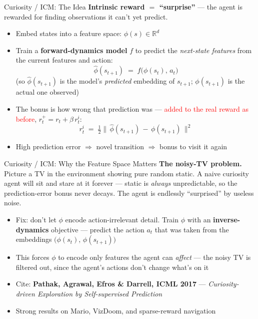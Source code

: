 \begin{frame}{Curiosity / ICM: The Idea}
\textbf{Intrinsic reward $=$ ``surprise''} --- the agent is rewarded for finding observations it can't yet predict.
\begin{itemize}
    \setlength{\itemsep}{0.55em}
    \item Embed states into a feature space: $\phi(s) \in \mathbb{R}^d$
    \item Train a \textbf{forward-dynamics model} $f$ to predict the \emph{next-state features} from the current features and action:
    \[
        \hat{\phi}(s_{t+1}) \;=\; f\!\big(\phi(s_t),\, a_t\big)
    \]
    (so $\hat{\phi}(s_{t+1})$ is the model's \emph{predicted} embedding of $s_{t+1}$; $\phi(s_{t+1})$ is the actual one observed)
    \item The bonus is how wrong that prediction was --- \textcolor{red}{added to the real reward as before}, $r_t^+ = r_t + \beta\, r_t^i$:
    \[
        r_t^i \;=\; \tfrac{1}{2}\big\|\,\hat{\phi}(s_{t+1}) \,-\, \phi(s_{t+1})\,\big\|^2
    \]
    \item High prediction error $\Rightarrow$ novel transition $\Rightarrow$ bonus to visit it again
\end{itemize}
\end{frame}

\begin{frame}{Curiosity / ICM: Why the Feature Space Matters}
\textbf{The noisy-TV problem.} Picture a TV in the environment showing pure random static. A naive curiosity agent will sit and stare at it forever --- static is \emph{always} unpredictable, so the prediction-error bonus never decays. The agent is endlessly ``surprised'' by useless noise.
\vspace{0.4em}
\begin{itemize}
    \setlength{\itemsep}{0.5em}
    \item Fix: don't let $\phi$ encode action-irrelevant detail. Train $\phi$ with an \textbf{inverse-dynamics} objective --- predict the action $a_t$ that was taken from the embeddings $\big(\phi(s_t),\, \phi(s_{t+1})\big)$
    \item This forces $\phi$ to encode only features the agent can \emph{affect} --- the noisy TV is filtered out, since the agent's actions don't change what's on it
    \item Cite: \textbf{Pathak, Agrawal, Efros \& Darrell, ICML 2017} --- \emph{Curiosity-driven Exploration by Self-supervised Prediction}
    \item Strong results on Mario, VizDoom, and sparse-reward navigation
\end{itemize}
\end{frame}

